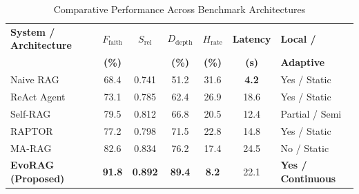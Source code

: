 \begin{table}[H]
\centering
\caption{Comparative Performance Across Benchmark Architectures}
\label{tab:system_comparison}
\small
\setlength{\tabcolsep}{4.5pt}
\renewcommand{\arraystretch}{1.3}
\begin{tabularx}{\linewidth}{|>{\raggedright\arraybackslash}p{3.4cm}|c|c|c|c|c|>{\centering\arraybackslash}X|}
\hline
\textbf{System / Architecture} & \textbf{$F_{\text{faith}}$} & \textbf{$S_{\text{rel}}$} & \textbf{$D_{\text{depth}}$} & \textbf{$H_{\text{rate}}$} & \textbf{Latency} & \textbf{Local /} \\
& \textbf{(\%)} & & \textbf{(\%)} & \textbf{(\%)} & \textbf{(s)} & \textbf{Adaptive} \\
\hline
Naive RAG~\cite{lewis2020rag} & 68.4 & 0.741 & 51.2 & 31.6 & \textbf{4.2} & Yes / Static \\
\hline
ReAct Agent~\cite{yao2022react} & 73.1 & 0.785 & 62.4 & 26.9 & 18.6 & Yes / Static \\
\hline
Self-RAG~\cite{asai2023selfrag} & 79.5 & 0.812 & 66.8 & 20.5 & 12.4 & Partial / Semi \\
\hline
RAPTOR~\cite{sarthi2024raptor} & 77.2 & 0.798 & 71.5 & 22.8 & 14.8 & Yes / Static \\
\hline
MA-RAG~\cite{nguyen2025marag} & 82.6 & 0.834 & 76.2 & 17.4 & 24.5 & No / Static \\
\hline
\textbf{EvoRAG (Proposed)} & \textbf{91.8} & \textbf{0.892} & \textbf{89.4} & \textbf{8.2} & 22.1 & \textbf{Yes / Continuous} \\
\hline
\end{tabularx}
\end{table}

